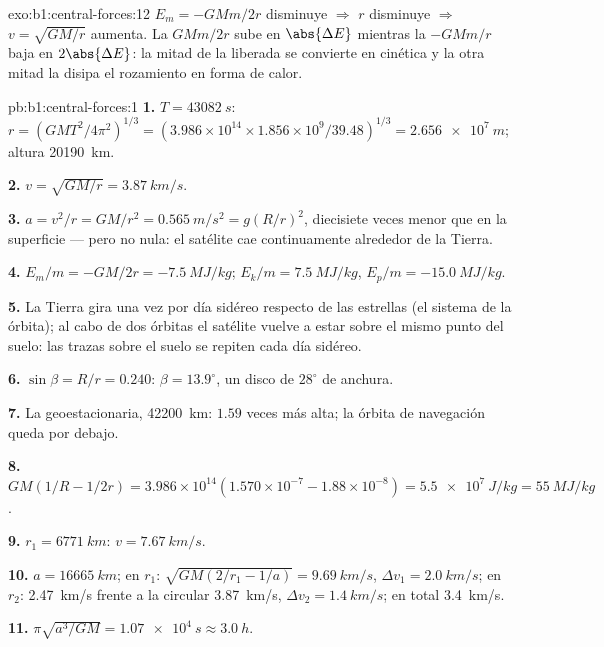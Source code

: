 \begin{solution}{exo:b1:central-forces:12}
$E_m = -GMm/2r$ disminuye $\Rightarrow$ $r$ disminuye $\Rightarrow$ $v =
\sqrt{GM/r}$ aumenta. La  $GMm/2r$ sube en $\abs{\Delta E}$
mientras la  $-GMm/r$ baja en $2\abs{\Delta E}$: la mitad
de la  liberada se convierte en cinética y la otra mitad
la disipa el rozamiento en forma de calor.
\end{solution}

\begin{solution}{pb:b1:central-forces:1}
\textbf{1.} $T = \qty{43082}{s}$: $r = (GMT^2/4\pi^2)^{1/3} = (3.986\times10^{14}
\times 1.856\times10^9/39.48)^{1/3} = \qty{2.656e7}{m}$; altura
\qty{20190}{km}.

\textbf{2.} $v = \sqrt{GM/r} = \qty{3.87}{km/s}$.

\textbf{3.} $a = v^2/r = GM/r^2 = \qty{0.565}{m/s^2} = g(R/r)^2$, diecisiete
veces menor que en la superficie --- pero no nula: el satélite cae
continuamente alrededor de la Tierra.

\textbf{4.} $E_m/m = -GM/2r = \qty{-7.5}{MJ/kg}$; $E_k/m = \qty{+7.5}{MJ/kg}$,
$E_p/m = \qty{-15.0}{MJ/kg}$.

\textbf{5.} La Tierra gira una vez por día sidéreo respecto de las
estrellas (el sistema de la órbita); al cabo de dos órbitas el satélite
vuelve a estar sobre el mismo punto del suelo: las trazas sobre el suelo
se repiten cada día sidéreo.

\textbf{6.} $\sin\beta = R/r = 0.240$: $\beta = 13.9^\circ$, un disco de
$28^\circ$ de anchura.

\textbf{7.} La geoestacionaria, \qty{42200}{km}: $1.59$ veces más alta; la
órbita de navegación queda por debajo.

\textbf{8.} $GM(1/R - 1/2r) = 3.986\times10^{14}(1.570\times10^{-7} - 1.88\times
10^{-8}) = \qty{5.5e7}{J/kg} = \qty{55}{MJ/kg}$.

\textbf{9.} $r_1 = \qty{6771}{km}$: $v = \qty{7.67}{km/s}$.

\textbf{10.} $a = \qty{16665}{km}$; en $r_1$: $\sqrt{GM(2/r_1 - 1/a)} =
\qty{9.69}{km/s}$, $\Delta v_1 = \qty{2.0}{km/s}$; en $r_2$: \qty{2.47}{km/s}
frente a la circular \qty{3.87}{km/s}, $\Delta v_2 = \qty{1.4}{km/s}$; en
total \qty{3.4}{km/s}.

\textbf{11.} $\pi\sqrt{a^3/GM} = \qty{1.07e4}{s} \approx \qty{3.0}{h}$.


\end{solution}
